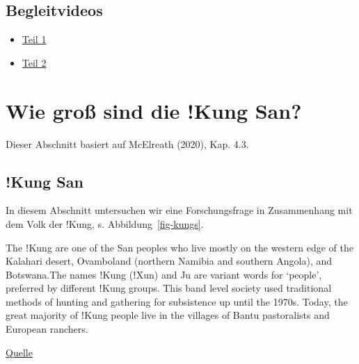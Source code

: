 \documentclass[
  a4paper,
  DIV=11]{scrreprt}
\providecommand{\tightlist}{%
  \setlength{\itemsep}{0pt}\setlength{\parskip}{0pt}}\usepackage{longtable,booktabs,array}
\theoremstyle{definition}
\theoremstyle{remark}
\begin{document}
\hypertarget{begleitvideos-5}{%
\subsection{Begleitvideos}\label{begleitvideos-5}}

\begin{itemize}
\tightlist
\item
  \href{https://youtu.be/cYHArln1DkM}{Teil 1}
\item
  \href{https://youtu.be/qIuu-4qRT_0}{Teil 2}
\end{itemize}

\hypertarget{wie-grouxdf-sind-die-kung-san}{%
\section{Wie groß sind die !Kung
San?}\label{wie-grouxdf-sind-die-kung-san}}

Dieser Abschnitt basiert auf McElreath (2020), Kap. 4.3.

\hypertarget{kung-san}{%
\subsection{!Kung San}\label{kung-san}}

In diesem Abschnitt untersuchen wir eine Forschungsfrage in Zusammenhang
mit dem Volk der !Kung, s. Abbildung~\ref{fig-kungs}.

The ǃKung are one of the San peoples who live mostly on the western edge
of the Kalahari desert, Ovamboland (northern Namibia and southern
Angola), and Botswana.The names ǃKung (ǃXun) and Ju are variant words
for `people', preferred by different ǃKung groups. This band level
society used traditional methods of hunting and gathering for
subsistence up until the 1970s. Today, the great majority of ǃKung
people live in the villages of Bantu pastoralists and European ranchers.

\href{https://en.wikipedia.org/wiki/\%C7\%83Kung_people}{Quelle}
\end{document}
